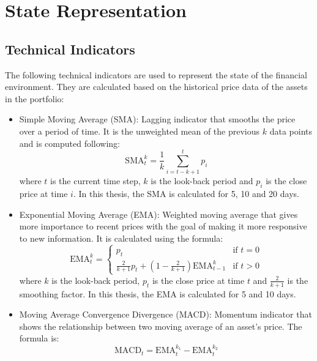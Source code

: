 \chapter{State Representation} \label{app:state_representation}

\section{Technical Indicators} \label{sec:technical-indicators}

The following technical indicators are used to represent the state of the financial environment. They are calculated based on the historical price data of the assets in the portfolio:

\begin{itemize}
    \item Simple Moving Average (SMA): Lagging indicator that smooths the price over a period of time. It is the unweighted mean of the previous $k$ data points and is computed following:
    \begin{equation}
        \text{SMA}_t^k = \frac{1}{k} \sum_{i=t-k+1}^{t} p_{i}
    \end{equation}
    where $t$ is the current time step, $k$ is the look-back period and $p_i$ is the close price at time $i$.
    In this thesis, the SMA is calculated for 5, 10 and 20 days. 
    \item Exponential Moving Average (EMA): Weighted moving average that gives more importance to recent prices with the goal of making it more responsive to new information. It is calculated using the formula:
    \begin{equation}
        \text{EMA}_t^k = \begin{cases} p_t & \text{if } t = 0 \\ \frac{2}{k+1} p_t + \left(1 - \frac{2}{k+1}\right) \text{EMA}_{t-1}^{k} & \text{if } t > 0 \end{cases}
    \end{equation}
    where $k$ is the look-back period, $p_t$ is the close price at time $t$ and $\frac{2}{k+1}$ is the smoothing factor. In this thesis, the EMA is calculated for 5 and 10 days.
    \item Moving Average Convergence Divergence (MACD): Momentum indicator that shows the relationship between two moving average of an asset's price. The formula is:
    \begin{equation}
        \text{MACD}_t = \text{EMA}_t^{k_1} - \text{EMA}_t^{k_2}
    \end{equation}

\end{itemize}
